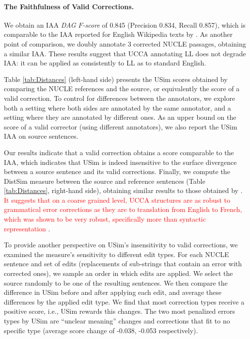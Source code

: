 \documentclass[a4paper, 11pt]{article}
\begin{document}
\paragraph{The Faithfulness of Valid Corrections.}
We obtain an IAA {\it DAG $F$-score} of 0.845
(Precision 0.834, Recall 0.857), which
is comparable to the IAA reported for English Wikipedia texts by \cite{abend2013universal}.
As another point of comparison, we doubly annotate 3 corrected
NUCLE \cite{dahlmeier2013building} passages, obtaining a similar IAA.
These results suggest that UCCA annotating LL does not degrade IAA:
it can be applied as consistently to LL as to standard English.

Table \ref{tab:Distances} (left-hand side) presents the {\sc USim} scores obtained by comparing 
the NUCLE references and the source, or equivalently the score of a valid correction.
To control for differences between the annotators, we explore both
a setting where both sides are annotated by the same annotator,
and a setting where they are annotated by different ones.
As an upper bound on the score of a valid corrector (using different annotators),
we also report the {\sc USim} IAA on source sentences. 

Our results indicate that a valid correction obtains a score comparable
to the IAA, which indicates that {\sc USim} is indeed
insensitive to the surface divergence between a source sentence and its valid corrections.
Finally, we compute the {\sc DistSim} measure
between the source and reference sentences (Table \ref{tab:Distances}, right-hand side),
obtaining similar results to those obtained by . \textcolor{red}{It suggests that on a coarse grained level, UCCA structures are as robust to grammatical error corrections as they are to translation from English to French, which was shown to be very robust, specifically more than syntactic representation \cite{sulem2015conceptual}}.

To provide another perspective on {\sc USim}'s insensitivity to valid corrections,
we examined the measure's sensitivity to different edit types. For each NUCLE sentence and set of edits (replacements of sub-strings 
that contain an error with corrected ones), we sample an order in which edits are applied.
We select the source randomly to be one of the resulting sentences. 
We then compare the difference in {\sc USim} before and after applying each edit, and average these differences 
by the applied edit type. 
We find that most correction types receive a positive score, i.e., {\sc USim} rewards this changes. The two most penalized errors types by {\sc USim} are ``unclear meaning'' changes and corrections that fit to no specific type (average score change of -0.038, -0.053 respectively).
\end{document}
